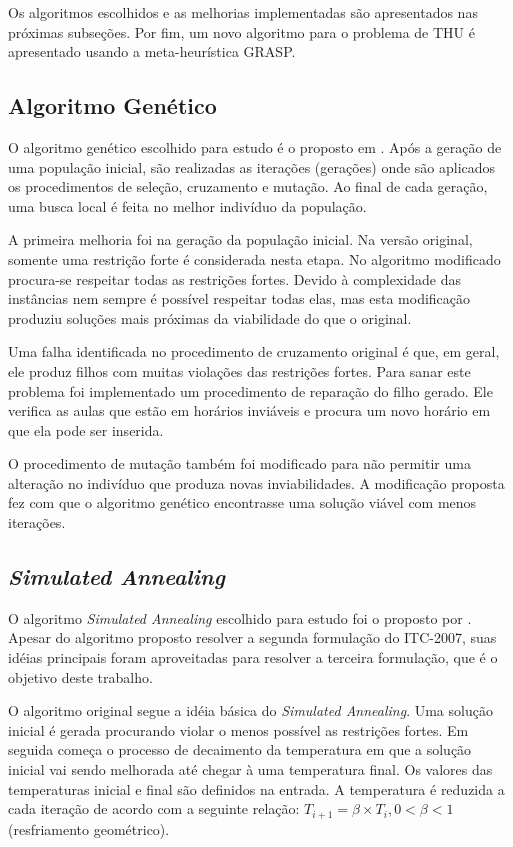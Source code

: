 \documentclass[11pt]{article}
\begin{document}
Os algoritmos escolhidos e as melhorias implementadas são apresentados nas próximas subseções. Por fim, um novo algoritmo para o problema de THU é apresentado usando a meta-heurística GRASP.

\subsection{Algoritmo Genético}

O algoritmo genético escolhido para estudo é o proposto em \cite{massoodian2008}. Após a geração de uma população inicial, são realizadas as iterações (gerações) onde são aplicados os procedimentos de seleção, cruzamento e mutação. Ao final de cada geração, uma busca local é feita no melhor indivíduo da população.

A primeira melhoria foi na geração da população inicial. Na versão original, somente uma restrição forte é considerada nesta etapa. No algoritmo modificado procura-se respeitar todas as restrições fortes. Devido à complexidade das instâncias nem sempre é possível respeitar todas elas, mas esta modificação produziu soluções mais próximas da viabilidade do que o original.

Uma falha identificada no procedimento de cruzamento original é que, em geral, ele produz filhos com muitas violações das restrições fortes. Para sanar este problema foi implementado um procedimento de reparação do filho gerado. Ele verifica as aulas que estão em horários inviáveis e procura um novo horário em que ela pode ser inserida.

O procedimento de mutação também foi modificado para não permitir uma alteração no indivíduo que produza novas inviabilidades. A modificação proposta fez com que o algoritmo genético encontrasse uma solução viável com menos iterações.

\subsection{\textit{Simulated Annealing}}

O algoritmo \textit{Simulated Annealing} escolhido para estudo foi o proposto por \cite{CDGS11b}. Apesar do algoritmo proposto resolver a segunda formulação do ITC-2007, suas idéias principais foram aproveitadas para resolver a terceira formulação, que é o objetivo deste trabalho.

O algoritmo original segue a idéia básica do \textit{Simulated Annealing}. Uma solução inicial é gerada procurando violar o menos possível as restrições fortes. Em seguida começa o processo de decaimento da temperatura em que a solução inicial vai sendo melhorada até chegar à uma temperatura final. Os valores das temperaturas inicial e final são definidos na entrada. A temperatura é reduzida a cada iteração de acordo com a seguinte relação: $T_{i+1} = \beta \times T_i, 0 < \beta < 1$ (resfriamento geométrico).
\end{document}
